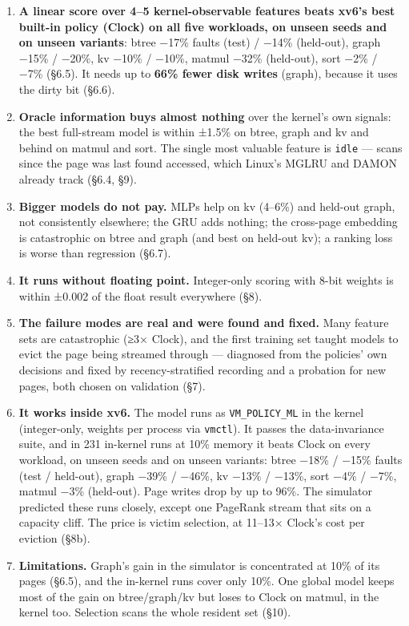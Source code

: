 \documentclass[10pt,a4paper]{article}
\newcommand{\code}[1]{\texttt{#1}}
\begin{document}
\begin{enumerate}
\item \textbf{A linear score over 4–5 kernel-observable features beats xv6's best built-in policy (Clock) on all five workloads, on unseen seeds and on unseen variants}: btree −17\% faults (test) / −14\% (held-out), graph −15\% / −20\%, kv −10\% / −10\%, matmul −32\% (held-out), sort −2\% / −7\% (§6.5). It needs up to \textbf{66\% fewer disk writes} (graph), because it uses the dirty bit (§6.6).
\item \textbf{Oracle information buys almost nothing} over the kernel's own signals: the best full-stream model is within ±1.5\% on btree, graph and kv and behind on matmul and sort. The single most valuable feature is \code{idle} — scans since the page was last found accessed, which Linux's MGLRU and DAMON already track (§6.4, §9).
\item \textbf{Bigger models do not pay.} MLPs help on kv (4–6\%) and held-out graph, not consistently elsewhere; the GRU adds nothing; the cross-page embedding is catastrophic on btree and graph (and best on held-out kv); a ranking loss is worse than regression (§6.7).
\item \textbf{It runs without floating point.} Integer-only scoring with 8-bit weights is within ±0.002 of the float result everywhere (§8).
\item \textbf{The failure modes are real and were found and fixed.} Many feature sets are catastrophic (≥3× Clock), and the first training set taught models to evict the page being streamed through — diagnosed from the policies' own decisions and fixed by recency-stratified recording and a probation for new pages, both chosen on validation (§7).
\item \textbf{It works inside xv6.} The model runs as \code{VM\_\allowbreak{}POLICY\_\allowbreak{}ML} in the kernel (integer-only, weights per process via \code{vmctl}). It passes the data-invariance suite, and in 231 in-kernel runs at 10\% memory it beats Clock on every workload, on unseen seeds and on unseen variants: btree −18\% / −15\% faults (test / held-out), graph −39\% / −46\%, kv −13\% / −13\%, sort −4\% / −7\%, matmul −3\% (held-out). Page writes drop by up to 96\%. The simulator predicted these runs closely, except one PageRank stream that sits on a capacity cliff. The price is victim selection, at 11–13× Clock's cost per eviction (§8b).
\item \textbf{Limitations.} Graph's gain in the simulator is concentrated at 10\% of its pages (§6.5), and the in-kernel runs cover only 10\%. One global model keeps most of the gain on btree/graph/kv but loses to Clock on matmul, in the kernel too. Selection scans the whole resident set (§10).
\end{enumerate}
\end{document}

